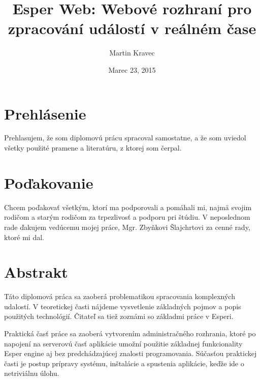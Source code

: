 \documentclass[12pt, a4paper, oneside]{book} %
\begin{document}
\title{Esper Web: Webové rozhraní pro zpracování událostí v reálném čase}

\author{Martin Kravec}
\date{Marec 23, 2015}

\frontmatter

\maketitle \thispagestyle{empty} \emptydoublepage

\chapter*{Prehlásenie}
Prehlasujem, že som diplomovú prácu spracoval samostatne, a že som uviedol všetky použité pramene a literatúru, z ktorej som čerpal.

\emptydoublepage

\chapter*{Poďakovanie}
Chcem poďakovať všetkým, ktorí ma podporovali a pomáhali mi, najmä svojim rodičom a starým rodičom za trpezlivosť a podporu pri štúdiu. V neposlednom rade ďakujem vedúcemu mojej práce, Mgr. Zbyňkovi Šlajchrtovi za cenné rady, ktoré mi dal.

\emptydoublepage


\chapter*{Abstrakt}
Táto diplomová práca sa zaoberá problematikou spracovania komplexných udalostí. V teoretickej časti nájdeme vysvetlenie základných pojmov a popis použitých technológií. Čitateľ sa tiež zoznámi so základmi práce v Esperi.

Praktická časť práce sa zaoberá vytvorením administračného rozhrania, ktoré po napojení na serverovú časť aplikácie umožní použitie základnej funkcionality Esper engine aj bez predchádzajúcej znalosti programovania. Súčasťou praktickej časti je postup prípravy systému, inštalácie a spustenia aplikácie, keďže ide o netriviálnu úlohu.
\end{document}

